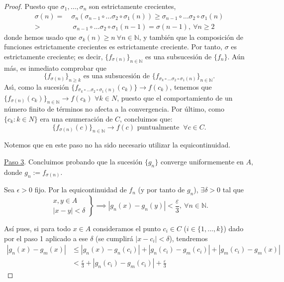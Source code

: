 \begin{proof}
    Puesto que $\sigma_1, \dots ,\sigma_n$ son estrictamente crecientes,
    \[
      \begin{aligned}
        \sigma (n) = \ & \sigma_n ( \sigma_{n-1} \circ \dots \sigma_2 \circ\sigma_1 (n))
        \geq \sigma_{n-1} \circ \dots \sigma_2 \circ\sigma_1 (n)
        \\
        >& \ \sigma_{n-1} \circ \dots \sigma_2 \circ\sigma_1 (n-1) = \sigma (n-1) , \ \forall n\geq 2
      \end{aligned}
    \]
    donde hemos usado que
    $\sigma_k(n) \ge n \ \forall n \in \mathbb{N}$, y también que la
    composición de funciones estrictamente crecientes es estrictamente
    creciente. Por tanto, $\sigma$ es estrictamente creciente; es
    decir, $\{f_{\sigma (n)} \}_{n\in\mathbb N}$ es una subsucesión de
    $\{f_n\}$. A\'un m\'as, es inmediato comprobar que
    \[
      \{f_{\sigma (n)}\}_{n\geq k} \mbox{ es una subsucesi\'on de } \{
      f_{\sigma_k \circ \dots \sigma_2 \circ\sigma_1 (n)}
      \}_{n\in\mathbb N} .
    \]
    As\'{\i}, como la sucesión
    $\{ f_{\sigma_k \circ \dots \sigma_2 \circ\sigma_1 (n)} (c_k) \}
    \to f(c_k)$, tenemos que
    $\{f_{\sigma (n)} (c_k) \}_{n\in\mathbb N} \longrightarrow f(c_k)$
    $\forall k\in N$, puesto que el comportamiento de un número finito
    de términos no afecta a la convergencia. Por último, como
    $\{c_k : k \in N \}$ era una enumeración de $C$, concluimos que:
    \[
      \{f_{\sigma (n)} (c) \}_{n\in\mathbb N} \longrightarrow f(c)
      \mbox{ puntualmente } \ \forall c\in C.
    \]

    Notemos que en este paso no ha sido necesario utilizar la
    equicontinuidad.

    \underline{Paso 3}. Concluimos probando que la sucesión $\{g_n\}$
    converge uniformemente en $A$, donde $g_n := f_{\sigma(n)}$.

    Sea $\epsilon>0$ fijo. Por la equicontinuidad de $f_n$ (y por
    tanto de $g_n$), $\exists\delta>0$ tal que
    \[
      \left.
        \begin{array}{c}
          x,y\in A
          \\
          |x-y| <\delta
        \end{array}
      \right\}
      \implies |g_n(x)-g_n(y)|<\frac{\varepsilon}{3} , \ \forall n\in\mathbb N.
    \]

    Así pues, si para todo $x\in A$ consideramos el punto $c_i\in C$
    ($i \in \{1,\dots,k\}$) dado por el paso 1 aplicado a ese
    $\delta$ (se cumplirá $|x-c_i| < \delta$), tendremos
    \[
      \begin{aligned}
        |g_n(x)-g_m(x)| &\leq |g_n(x)-g_n(c_i)| +
        |g_n(c_i)-g_m(c_i)|+|g_m(c_i)-g_m(x)|
        \\
        &<\frac{\varepsilon}{3} +|g_n(c_i)-g_m(c_i)| +
        \frac{\varepsilon}{3}
      \end{aligned}
    \]


\end{proof}

